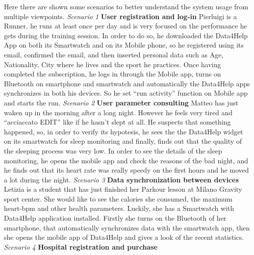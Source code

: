 Here there are shown some scenarios to better understand the system usage from multiple viewpoints.\vspace{2mm}  \newline 
\noindent \emph{Scenario 1}\textbf{ User registration and log-in} \newline
Pierluigi is a Runner, he runs at least once per day and is very focused on the performance he gets during the training session.
In order to do so, he downloaded the Data4Help App on both its Smartwatch and on its Mobile phone, so he registered using its email, confirmed the email, and then inserted personal data such as Age, Nationality, City where he lives and the sport he practices.
Once having completed the subscription, he logs in through the Mobile app, turns on Bluetooth on smartphone and smartwatch and automatically the Data4Help apps synchronizes in both his devices. So he set “run activity” function on Mobile app and starts the run.
\vspace{2mm} \newline
\noindent \emph{Scenario 2}\textbf{ User parameter consulting} \newline
Matteo has just waken up in the morning after a long night. However he feels very tired and “acciaccato EDIT” like if he hasn’t slept at all. He suspects that something happened, so, in order to verify its hypotesis, he sees the the Data4Help widget on its smartwatch for sleep monitoring and finally, finds out that the quality of the sleeping process was very low.
In order to see the details of the sleep monitoring, he opens the mobile app and check the reasons of the bad night, and he finds out that its heart rate was really speedy on the first hours and he moved a lot during the night.
\vspace{2mm} \newline
\noindent \emph{Scenario 3} \textbf{Data synchronization between devices}
Letizia is a student that has just finished her Parkour lesson at Milano Gravity sport center.
She would like to see the calories she consumed, the maximum heart-bpm and other health parameters. Luckily, she has a Smartwatch with Data4Help application installed. Firstly she turns on the Bluetooth of her smartphone, that automatically synchronizes data with the smartwatch app, then she opens the mobile app of Data4Help and gives a look of the recent statistics.
\vspace{2mm} \newline
\noindent \emph{Scenario 4} \textbf{Hospital registration and purchase } \newline
